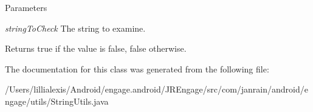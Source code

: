 \begin{DoxyParams}{Parameters}
\item[{\em stringToCheck}]The string to examine.\end{DoxyParams}
\begin{DoxyReturn}{Returns}
{\ttfamily true} if the value is false, {\ttfamily false} otherwise. 
\end{DoxyReturn}


The documentation for this class was generated from the following file:\begin{DoxyCompactItemize}
\item 
/Users/lillialexis/Android/engage.android/JREngage/src/com/janrain/android/engage/utils/StringUtils.java\end{DoxyCompactItemize}
